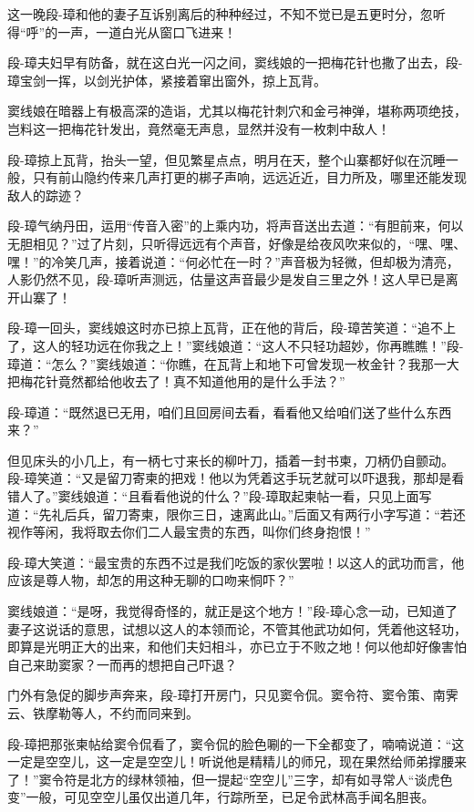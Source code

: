 \documentclass[12pt,oneside]{book}
\begin{document}
这一晚段-璋和他的妻子互诉别离后的种种经过，不知不觉已是五更时分，忽听得``呼''的一声，一道白光从窗口飞进来！

段-璋夫妇早有防备，就在这白光一闪之间，窦线娘的一把梅花针也撒了出去，段-璋宝剑一挥，以剑光护体，紧接着窜出窗外，掠上瓦背。

窦线娘在暗器上有极高深的造诣，尤其以梅花针刺穴和金弓神弹，堪称两项绝技，岂料这一把梅花针发出，竟然毫无声息，显然并没有一枚刺中敌人！

段-璋掠上瓦背，抬头一望，但见繁星点点，明月在天，整个山寨都好似在沉睡一般，只有前山隐约传来几声打更的梆子声响，远远近近，目力所及，哪里还能发现敌人的踪迹？

段-璋气纳丹田，运用``传音入密''的上乘内功，将声音送出去道：``有胆前来，何以无胆相见？''过了片刻，只听得远远有个声音，好像是给夜风吹来似的，``嘿、嘿、嘿！''的冷笑几声，接着说道：``何必忙在一时？''声音极为轻微，但却极为清亮，人影仍然不见，段-璋听声测远，估量这声音最少是发自三里之外！这人早已是离开山寨了！

段-璋一回头，窦线娘这时亦已掠上瓦背，正在他的背后，段-璋苦笑道：``追不上了，这人的轻功远在你我之上！''窦线娘道：``这人不只轻功超妙，你再瞧瞧！''段-璋道：``怎么？''窦线娘道：``你瞧，在瓦背上和地下可曾发现一枚金针？我那一大把梅花针竟然都给他收去了！真不知道他用的是什么手法？''

段-璋道：``既然退已无用，咱们且回房间去看，看看他又给咱们送了些什么东西来？''

但见床头的小几上，有一柄七寸来长的柳叶刀，插着一封书柬，刀柄仍自颤动。段-璋笑道：``又是留刀寄柬的把戏！他以为凭着这手玩艺就可以吓退我，那却是看错人了。''窦线娘道：``且看看他说的什么？''段-璋取起柬帖一看，只见上面写道：``先礼后兵，留刀寄柬，限你三日，速离此山。''后面又有两行小字写道：``若还视作等闲，我将取去你们二人最宝贵的东西，叫你们终身抱恨！''

段-璋大笑道：``最宝贵的东西不过是我们吃饭的家伙罢啦！以这人的武功而言，他应该是尊人物，却怎的用这种无聊的口吻来恫吓？''

窦线娘道：``是呀，我觉得奇怪的，就正是这个地方！''段-璋心念一动，已知道了妻子这说话的意思，试想以这人的本领而论，不管其他武功如何，凭着他这轻功，即算是光明正大的出来，和他们夫妇相斗，亦已立于不败之地！何以他却好像害怕自己来助窦家？一而再的想把自己吓退？

门外有急促的脚步声奔来，段-璋打开房门，只见窦令侃。窦令符、窦令策、南霁云、铁摩勒等人，不约而同来到。

段-璋把那张柬帖给窦令侃看了，窦令侃的脸色唰的一下全都变了，喃喃说道：``这一定是空空儿，这一定是空空儿！听说他是精精儿的师兄，现在果然给师弟撑腰来了！''窦令符是北方的绿林领袖，但一提起``空空儿''三字，却有如寻常人``谈虎色变''一般，可见空空儿虽仅出道几年，行踪所至，已足令武林高手闻名胆丧。
\end{document}
